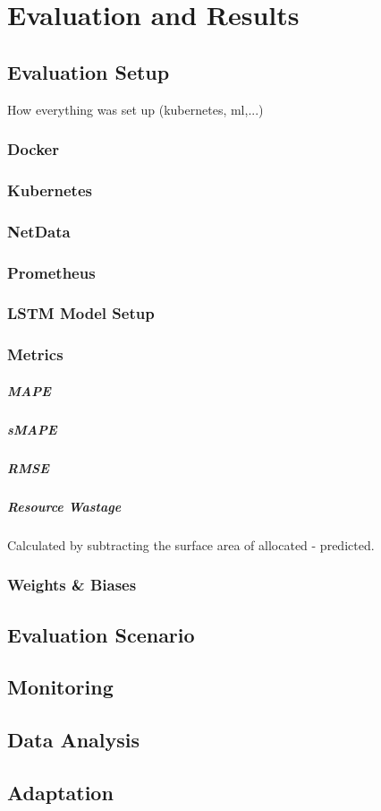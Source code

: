 \chapter{Evaluation and Results}

\section{Evaluation Setup}
  How everything was set up (kubernetes, ml,...)
  \subsection{Docker}
  \subsection{Kubernetes}
  \subsection{NetData}
  \subsection{Prometheus}
  \subsection{LSTM Model Setup}
  \subsection{Metrics}

    \paragraph{MAPE}
    \paragraph{sMAPE}
    \paragraph{RMSE}
    \paragraph{Resource Wastage}
      Calculated by subtracting the surface area of allocated - predicted.
  \subsection{Weights \& Biases}
\section{Evaluation Scenario}
\section{Monitoring}
\section{Data Analysis}
\section{Adaptation}